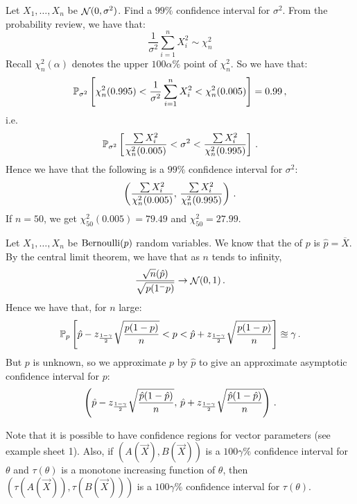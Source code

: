 \begin{example}
Let $X_1, \dotsc, X_n$ be \iid $\mathop{\mathcal{N}}(0, \sigma^2)$. Find a $99\%$ confidence interval for $\sigma^2$.
From the probability review, we have that:
\[
\frac{1}{\sigma^2}\sum_{i=1}^n X_i^2 \sim \chi^2_n
\]
Recall $\chi^2_n(\alpha)$ denotes the upper $100\alpha\%$ point of $\chi^2_n$.
So we have that:
\[
\mathbb{P}_{\sigma^2} \left[ \chi^2_n(0.995) < \frac{1}{\sigma^2}\sum_{i=1}^n X_i^2 < \chi^2_n(0.005) \right] = 0.99 \, {,}
\]
i.e.
\[
\mathbb{P}_{\sigma^2} \left[ \frac{\sum X_i^2}{\chi^2_n(0.005)} < \sigma^2 < \frac{\sum X_i^2}{\chi^2_n(0.995)} \right] \, {.}
\]
Hence we have that the following is a $99\%$ confidence interval for $\sigma^2$:
\[
\left(\frac{\sum X_i^2}{\chi^2_n(0.005)}, \, \frac{\sum X_i^2}{\chi^2_n(0.995)} \right) \, {.}
\]
If $n = 50$, we get $\chi^2_{50}(0.005) = 79.49$ and $\chi^2_{50} = 27.99$.
\end{example}

\begin{example}
Let $X_1, \dotsc, X_n$ be \iid $\operatorname{Bernoulli}(p)$ random variables. We know that the \mle of $p$ is $\hat{p} = \overline{X}$.
By the central limit theorem, we have that as $n$ tends to infinity,
\[
\frac{\sqrt{n}(\hat{p})}{\sqrt{p(1^-p)}} \rightarrow \mathop{\mathcal{N}}(0, 1) \, {.}
\]
Hence we have that, for $n$ large:
\[
\mathbb{P}_p \left[ \hat{p} - z_{\frac{1-\gamma}{2}}\sqrt{\frac{p(1-p)}{n}} < p < \hat{p} + z_{\frac{1-\gamma}{2}} \sqrt{\frac{p(1-p)}{n}} \right] \approxeq \gamma \, {.}
\]
But $p$ is unknown, so we approximate $p$ by $\hat{p}$ to give an approximate asymptotic confidence interval for $p$:
\[
\left( \hat{p} - z_{\frac{1-\gamma}{2}}\sqrt{\frac{\hat{p}(1-\hat{p})}{n}}, \, \hat{p} + z_{\frac{1-\gamma}{2}}\sqrt{\frac{\hat{p}(1-\hat{p})}{n}} \right) \, {.}
\]
\end{example}

Note that it is possible to have confidence regions for vector parameters (see example sheet 1). Also, if $\left(A(\vec{X}), B(\vec{X})\right)$ is a $100\gamma\%$ confidence interval for $\theta$ and $\tau(\theta)$ is a monotone increasing function of $\theta$, then $\left(\tau(A(\vec{X})), \tau(B(\vec{X}))\right)$ is a $100\gamma\%$ confidence interval for $\tau(\theta)$.



